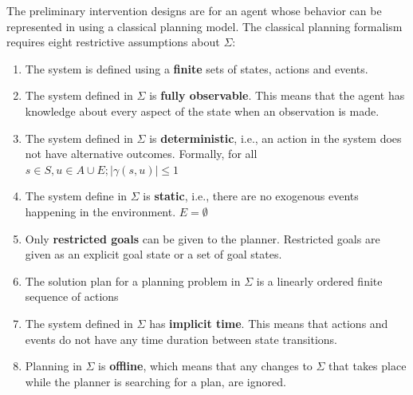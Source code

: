The preliminary intervention designs are for an agent whose behavior can be represented in using a classical planning model. The classical planning formalism requires eight restrictive assumptions about $\Sigma$:
\begin{enumerate}
\item The system is defined using a \textbf{finite} sets of states, actions and events.
\item The system defined in $\Sigma$ is \textbf{fully observable}. This means that the agent has knowledge  about every aspect of the state when an observation is made.
\item The system defined in $\Sigma$ is \textbf{deterministic}, i.e., an action in the system does not have alternative outcomes. Formally, for all $s\in S, u\in A\cup E; |\gamma(s,u)|\leq1$
\item The system define in $\Sigma$ is \textbf{static}, i.e., there are no exogenous events happening in the environment. $E=\emptyset$
\item Only \textbf{restricted goals} can be given to the planner. Restricted goals are given as an explicit goal state or a set of goal states.
\item The solution plan for a planning problem in $\Sigma$ is a linearly ordered finite sequence of actions
\item The system defined in $\Sigma$ has \textbf{implicit time}. This means that actions and events do not have any time duration between state transitions.
\item Planning in $\Sigma$ is \textbf{offline}, which means that any changes to $\Sigma$ that takes place while the planner is searching for a plan, are ignored.
\end{enumerate}


